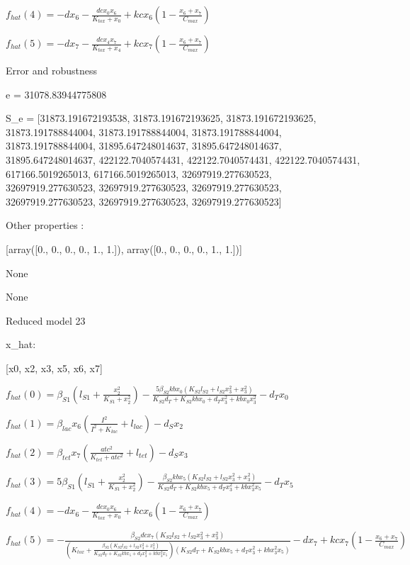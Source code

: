 $f_{hat}(4)=- d x_{6} - \frac{dc x_{0} x_{6}}{K_{tox} + x_{0}} + kc x_{6} \left(1 - \frac{x_{6} + x_{7}}{C_{max}}\right)$


$f_{hat}(5)=- d x_{7} - \frac{dc x_{4} x_{7}}{K_{tox} + x_{4}} + kc x_{7} \left(1 - \frac{x_{6} + x_{7}}{C_{max}}\right)$



Error and robustness 


e = 31078.83944775808

S_e = [31873.191672193538, 31873.191672193625, 31873.191672193625, 31873.191788844004, 31873.191788844004, 31873.191788844004, 31873.191788844004, 31895.647248014637, 31895.647248014637, 31895.647248014637, 422122.7040574431, 422122.7040574431, 422122.7040574431, 617166.5019265013, 617166.5019265013, 32697919.277630523, 32697919.277630523, 32697919.277630523, 32697919.277630523, 32697919.277630523, 32697919.277630523, 32697919.277630523]

Other properties :


[array([0., 0., 0., 0., 1., 1.]), array([0., 0., 0., 0., 1., 1.])]

None

None

Reduced model 23

x_{hat}: 

[x0, x2, x3, x5, x6, x7]


$f_{hat}(0)=\beta_{S1} \left(l_{S1} + \frac{x_{2}^{2}}{K_{S1} + x_{2}^{2}}\right) - \frac{5 \beta_{S2} kb x_{0} \left(K_{S2} l_{S2} + l_{S2} x_{3}^{2} + x_{3}^{2}\right)}{K_{S2} d_{T} + K_{S2} kb x_{0} + d_{T} x_{3}^{2} + kb x_{0} x_{3}^{2}} - d_{T} x_{0}$


$f_{hat}(1)=\beta_{lac} x_{6} \left(\frac{I^{2}}{I^{2} + K_{lac}} + l_{lac}\right) - d_{S} x_{2}$


$f_{hat}(2)=\beta_{tet} x_{7} \left(\frac{atc^{2}}{K_{tet} + atc^{2}} + l_{tet}\right) - d_{S} x_{3}$


$f_{hat}(3)=5 \beta_{S1} \left(l_{S1} + \frac{x_{2}^{2}}{K_{S1} + x_{2}^{2}}\right) - \frac{\beta_{S2} kb x_{5} \left(K_{S2} l_{S2} + l_{S2} x_{3}^{2} + x_{3}^{2}\right)}{K_{S2} d_{T} + K_{S2} kb x_{5} + d_{T} x_{3}^{2} + kb x_{3}^{2} x_{5}} - d_{T} x_{5}$


$f_{hat}(4)=- d x_{6} - \frac{dc x_{0} x_{6}}{K_{tox} + x_{0}} + kc x_{6} \left(1 - \frac{x_{6} + x_{7}}{C_{max}}\right)$


$f_{hat}(5)=- \frac{\beta_{S2} dc x_{7} \left(K_{S2} l_{S2} + l_{S2} x_{3}^{2} + x_{3}^{2}\right)}{\left(K_{tox} + \frac{\beta_{S2} \left(K_{S2} l_{S2} + l_{S2} x_{3}^{2} + x_{3}^{2}\right)}{K_{S2} d_{T} + K_{S2} kb x_{5} + d_{T} x_{3}^{2} + kb x_{3}^{2} x_{5}}\right) \left(K_{S2} d_{T} + K_{S2} kb x_{5} + d_{T} x_{3}^{2} + kb x_{3}^{2} x_{5}\right)} - d x_{7} + kc x_{7} \left(1 - \frac{x_{6} + x_{7}}{C_{max}}\right)$



